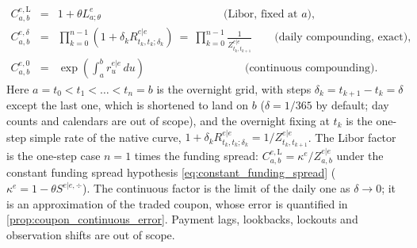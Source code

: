 \documentclass[11pt,english]{amsart}
\theoremstyle{definition}
\begin{document}
\begin{itemize}
\begin{eqnarray}
  C^{e,\mathrm{L}}_{a,b} &=& 1+\theta L^e_{a;\theta} \qquad\qquad\qquad\qquad\qquad\quad \textrm{(Libor, fixed at $a$)}, \nonumber\\
  C^{e,\delta}_{a,b} &=& \prod_{k=0}^{n-1}\left(1+\delta_k R^{e|e}_{t_k,t_k;\delta_k}\right) ~=~ \prod_{k=0}^{n-1}\frac{1}{Z^{e|e}_{t_k,t_{k+1}}} \qquad \textrm{(daily compounding, exact)}, \label{eq:coupon_factors}\\
  C^{e,0}_{a,b} &=& \exp\left(\int_a^b r^{e|e}_u\,du\right) \qquad\qquad\qquad\qquad\quad \textrm{(continuous compounding)}. \nonumber
\end{eqnarray}
Here $a = t_0 < t_1 < \ldots < t_n = b$ is the overnight grid, with steps $\delta_k = t_{k+1}-t_k = \delta$ except the last one, which is shortened to land on $b$ ($\delta = 1/365$ by default; day counts and calendars are out of scope), and the overnight fixing at $t_k$ is the one-step simple rate of the native curve, $1+\delta_kR^{e|e}_{t_k,t_k;\delta_k} = 1/Z^{e|e}_{t_k,t_{k+1}}$. The Libor factor is the one-step case $n=1$ times the funding spread: $C^{e,\mathrm{L}}_{a,b} = \kappa^e/Z^{e|e}_{a,b}$ under the constant funding spread hypothesis \eqref{eq:constant_funding_spread} ($\kappa^e = 1-\theta S^{e|e,\div}$). The continuous factor is the limit of the daily one as $\delta\to0$; it is an approximation of the traded coupon, whose error is quantified in \autoref{prop:coupon_continuous_error}. Payment lags, lookbacks, lockouts and observation shifts are out of scope.


\end{itemize}
\end{document}
